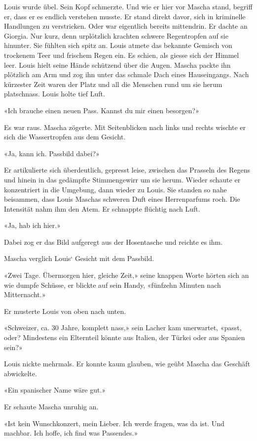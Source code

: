 Louis wurde übel. Sein Kopf schmerzte. Und wie er hier vor Mascha stand,
begriff er, dass er es endlich verstehen musste. Er stand direkt davor,
sich in kriminelle Handlungen zu verstricken. Oder war eigentlich
bereits mittendrin. Er dachte an Giorgia. Nur kurz, denn urplötzlich
krachten schwere Regentropfen auf sie hinunter. Sie fühlten sich spitz
an. Louis atmete das bekannte Gemisch von trockenem Teer und frischem
Regen ein. Es schien, als giesse sich der Himmel leer. Louis hielt seine
Hände schützend über die Augen. Mascha packte ihn plötzlich am Arm und
zog ihn unter das schmale Dach eines Hauseingangs. Nach kürzester Zeit
waren der Platz und all die Menschen rund um sie herum platschnass.
Louis holte tief Luft.

«Ich brauche einen neuen Pass. Kannst du mir einen besorgen?»

Es war raus. Mascha zögerte. Mit Seitenblicken nach links und rechts
wischte er sich die Wassertropfen aus dem Gesicht.

«Ja, kann ich. Passbild dabei?»

Er artikulierte sich überdeutlich, gepresst leise, zwischen das Prasseln
des Regens und hinein in das gedämpfte Stimmengewirr um sie herum.
Wieder schaute er konzentriert in die Umgebung, dann wieder zu Louis.
Sie standen so nahe beisammen, dass Louis Maschas schweren Duft eines
Herrenparfums roch. Die Intensität nahm ihm den Atem. Er schnappte
flüchtig nach Luft.

«Ja, hab ich hier.»

Dabei zog er das Bild aufgeregt aus der Hosentasche und reichte es ihm.

Mascha verglich Louis` Gesicht mit dem Passbild.

«Zwei Tage. Übermorgen hier, gleiche Zeit,» seine knappen Worte hörten
sich an wie dumpfe Schüsse, er blickte auf sein Handy, «fünfzehn Minuten
nach Mitternacht.»

Er musterte Louis von oben nach unten.

«Schweizer, ca. 30 Jahre, komplett nass,» sein Lacher kam unerwartet,
«passt, oder? Mindestens ein Elternteil könnte aus Italien, der Türkei
oder aus Spanien sein?»

Louis nickte mehrmals. Er konnte kaum glauben, wie geübt Mascha das
Geschäft abwickelte.

«Ein spanischer Name wäre gut.»

Er schaute Mascha unruhig an.

«Ist kein Wunschkonzert, mein Lieber. Ich werde fragen, was da ist. Und
machbar. Ich hoffe, ich find was Passendes.»

